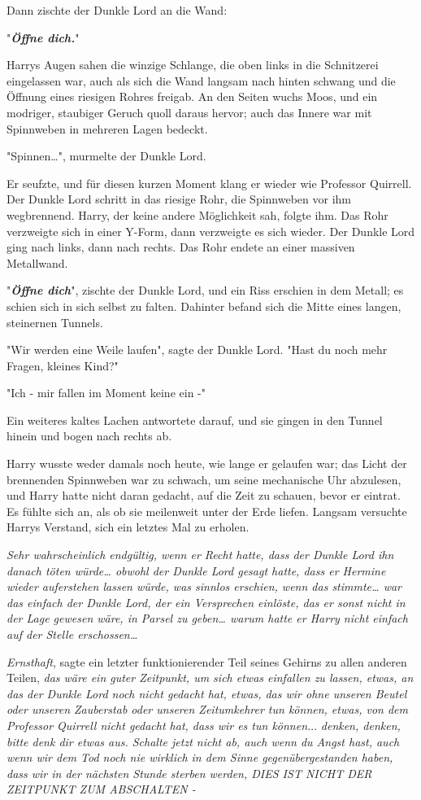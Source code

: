 {Dann zischte der Dunkle Lord an die Wand:

"\textbf{\emph{Öffne dich.}}"

Harrys Augen sahen die winzige Schlange, die oben links in die Schnitzerei eingelassen war, auch als sich die Wand langsam nach hinten schwang und die Öffnung eines riesigen Rohres freigab. An den Seiten wuchs Moos, und ein modriger, staubiger Geruch quoll daraus hervor; auch das Innere war mit Spinnweben in mehreren Lagen bedeckt.

"Spinnen…", murmelte der Dunkle Lord.

Er seufzte, und für diesen kurzen Moment klang er wieder wie Professor Quirrell. Der Dunkle Lord schritt in das riesige Rohr, die Spinnweben vor ihm wegbrennend. Harry, der keine andere Möglichkeit sah, folgte ihm. Das Rohr verzweigte sich in einer Y-Form, dann verzweigte es sich wieder. Der Dunkle Lord ging nach links, dann nach rechts. Das Rohr endete an einer massiven Metallwand.

"\textbf{\emph{Öffne dich}}", zischte der Dunkle Lord, und ein Riss erschien in dem Metall; es schien sich in sich selbst zu falten. Dahinter befand sich die Mitte eines langen, steinernen Tunnels.

"Wir werden eine Weile laufen", sagte der Dunkle Lord. "Hast du noch mehr Fragen, kleines Kind?"

"Ich - mir fallen im Moment keine ein -"

Ein weiteres kaltes Lachen antwortete darauf, und sie gingen in den Tunnel hinein und bogen nach rechts ab.

Harry wusste weder damals noch heute, wie lange er gelaufen war; das Licht der brennenden Spinnweben war zu schwach, um seine mechanische Uhr abzulesen, und Harry hatte nicht daran gedacht, auf die Zeit zu schauen, bevor er eintrat. Es fühlte sich an, als ob sie meilenweit unter der Erde liefen. Langsam versuchte Harrys Verstand, sich ein letztes Mal zu erholen.

\emph{Sehr wahrscheinlich endgültig, wenn er Recht hatte, dass der Dunkle Lord ihn danach töten würde… obwohl der Dunkle Lord gesagt hatte, dass er Hermine wieder auferstehen lassen würde, was sinnlos erschien, wenn das stimmte… war das einfach der Dunkle Lord, der ein Versprechen einlöste, das er sonst nicht in der Lage gewesen wäre, in Parsel zu geben… warum hatte er Harry nicht einfach auf der Stelle erschossen…}

\emph{Ernsthaft}, sagte ein letzter funktionierender Teil seines Gehirns zu allen anderen Teilen, \emph{das wäre ein guter Zeitpunkt, um sich etwas einfallen zu lassen, etwas, an das der Dunkle Lord noch nicht gedacht hat, etwas, das wir ohne unseren Beutel oder unseren Zauberstab oder unseren Zeitumkehrer tun können, etwas, von dem Professor Quirrell nicht gedacht hat, dass wir es tun können.}.. \emph{denken, denken, bitte denk dir etwas aus. Schalte jetzt nicht ab, auch wenn du Angst hast, auch wenn wir dem Tod noch nie wirklich in dem Sinne gegenübergestanden haben, dass wir in der nächsten Stunde sterben werden, DIES IST NICHT DER ZEITPUNKT ZUM ABSCHALTEN -}

}
